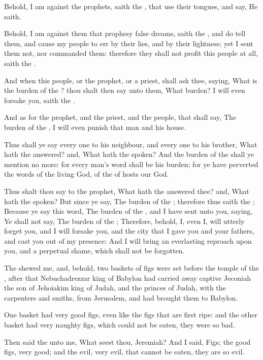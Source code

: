 \Verse Behold, I am against the prophets, saith the \LORD, that use their tongues, and say, He saith.

\Verse Behold, I am against them that prophesy false dreams, saith the \LORD, and do tell them, and cause my people to err by their lies, and by their lightness; yet I sent them not, nor commanded them: therefore they shall not profit this people at all, saith the \LORD.

\Verse And when this people, or the prophet, or a priest, shall ask thee, saying, What is the burden of the \LORD? thou shalt then say unto them, What burden? I will even forsake you, saith the \LORD.

\Verse And as for the prophet, and the priest, and the people, that shall say, The burden of the \LORD, I will even punish that man and his house.

\Verse Thus shall ye say every one to his neighbour, and every one to his brother, What hath the \LORD answered? and, What hath the \LORD spoken?  \Verse And the burden of the \LORD shall ye mention no more: for every man's word shall be his burden; for ye have perverted the words of the living God, of the \LORD of hosts our God.

\Verse Thus shalt thou say to the prophet, What hath the \LORD answered thee? and, What hath the \LORD spoken?  \Verse But since ye say, The burden of the \LORD; therefore thus saith the \LORD; Because ye say this word, The burden of the \LORD, and I have sent unto you, saying, Ye shall not say, The burden of the \LORD; \Verse Therefore, behold, I, even I, will utterly forget you, and I will forsake you, and the city that I gave you and your fathers, and cast you out of my presence: \Verse And I will bring an everlasting reproach upon you, and a perpetual shame, which shall not be forgotten.


\Chapter
\Verse The \LORD shewed me, and, behold, two baskets of figs were set before the temple of the \LORD, after that Nebuchadrezzar king of Babylon had carried away captive Jeconiah the son of Jehoiakim king of Judah, and the princes of Judah, with the carpenters and smiths, from Jerusalem, and had brought them to Babylon.

\Verse One basket had very good figs, even like the figs that are first ripe: and the other basket had very naughty figs, which could not be eaten, they were so bad.

\Verse Then said the \LORD unto me, What seest thou, Jeremiah? And I said, Figs; the good figs, very good; and the evil, very evil, that cannot be eaten, they are so evil.

